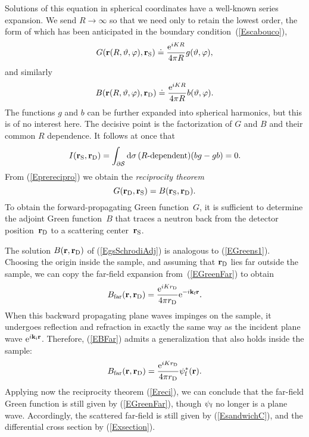 Solutions of this equation in spherical coordinates
have a well-known series expansion.
We send $R\to\infty$ so that we need only to retain the lowest order,
the form of which has been anticipated
in the boundary condition~(\ref{Escabouco}),
\begin{equation}
   G(\mathbf{r}(R,\vartheta,\varphi),\mathbf{r}_\text{S})
   \doteq \frac{\text{e}^{iKR}}{4\pi R} g(\vartheta,\varphi),
\end{equation}
and similarly 
\begin{equation}
   B(\mathbf{r}(R,\vartheta,\varphi),\mathbf{r}_\text{D})
   \doteq \frac{\text{e}^{iKR}}{4\pi R} b(\vartheta,\varphi).
\end{equation}
The functions $g$ and $b$ can be further expanded into spherical harmonics,
but this is of no interest here.
The decisive point is the factorization of $G$ and $B$
and their common $R$ dependence.
It follows at once that
\begin{equation}
  I(\mathbf{r}_\text{S},\mathbf{r}_\text{D})
  =\displaystyle\int_{\partial\mathcal{S}}\text{d}\sigma\,
       (\text{$R$-dependent})(bg-gb)
  = 0.
\end{equation}
From (\ref{Eprerecipro}) we obtain the \textit{reciprocity theorem}
\begin{equation}\label{Ereci}
  G(\mathbf{r}_\text{D},\mathbf{r}_\text{S}) = B(\mathbf{r}_\text{S},\mathbf{r}_\text{D}).
\end{equation}
To obtain the forward-propagating Green function~$G$,
it is sufficient to determine the adjoint Green function~$B$
that traces a neutron back from the detector position~$\mathbf{r}_\text{D}$
to a scattering center~$\mathbf{r}_\text{S}$.
%

The solution $B(\mathbf{r},\mathbf{r}_\text{D})$ of (\ref{EgsSchrodiAdj})
is analogous to (\ref{EGreens1}).
Choosing the origin inside the sample,
and assuming that $\mathbf{r}_\text{D}$ lies far outside the sample,
we can copy the far-field expansion from~(\ref{EGreenFar})
to obtain
%
\begin{equation}\label{EBFar}
  B_\text{far}(\mathbf{r},\mathbf{r}_\text{D})
  =\frac{\text{e}^{iKr_\text{D}}}{4\pi r_\text{D}}\text{e}^{-i\mathbf{k}_{\text{f}} \mathbf{r}}.
\end{equation}
When this backward propagating plane waves impinges on the sample,
it undergoes reflection and refraction in exactly the same way as
the incident plane wave $\text{e}^{i\mathbf{k}_{\text{i}}\mathbf{r}}$.
Therefore,
 (\ref{EBFar}) admits a generalization that also holds inside the sample:
\begin{equation}\label{EBFull}
  B_\text{far}(\mathbf{r},\mathbf{r}_\text{D})
  = \frac{\text{e}^{iKr_\text{D}}}{4\pi r_\text{D}}\psi^*_{\text{f}}(\mathbf{r}).
\end{equation}
Applying now the reciprocity theorem (\ref{Ereci}),
we can conclude that the far-field Green function
is still given by (\ref{EGreenFar}),
though $\psi_{\text{f}}$ no longer is a plane wave.
Accordingly,
the scattered far-field is still given by (\ref{EsandwichC}),
and the differential cross section by (\ref{Exsection}).

